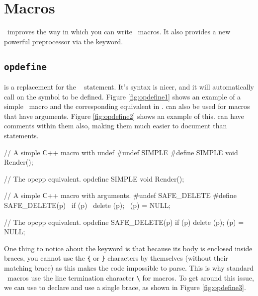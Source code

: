 
\chapter{Macros}
\label{chap:macros}

\opCPP\ improves the way in which you can write \cpp\ macros.  It also provides a new powerful preprocessor via the  keyword.

\section{{\tt opdefine}}
\label{sec:opdefine}

 is a replacement for the \cpp\  statement.  It's syntax is nicer, and it will automatically call  on the symbol to be defined.  Figure \ref{fig:opdefine1} shows an example of a simple \cpp\ macro and the corresponding equivalent in \opCPP.   can also be used for macros that have arguments.  Figure \ref{fig:opdefine2} shows an example of this.   can have comments within them also, making them much easier to document than \cpp\  statements.

\begin{opcpp}[label={fig:opdefine1},caption={Simple \cpp\ macro and corresponding equivalent in \opCPP.}]
// A simple C++ macro with undef
#undef SIMPLE
#define SIMPLE void Render();

// The opcpp equivalent.
opdefine SIMPLE
{
	void Render();
}
\end{opcpp}

\begin{opcpp}[label={fig:opdefine2},caption={\opcppK{opdefine} example with arguments.}]
// A simple C++ macro with arguments.
#undef SAFE_DELETE
#define SAFE_DELETE(p)  \
	if (p)				\
		delete (p);		\
	(p) = NULL;

// The opcpp equivalent.
opdefine SAFE_DELETE(p)
{
	if (p)
		delete (p);
	(p) = NULL;
}
\end{opcpp}

One thing to notice about the  keyword is that because its body is enclosed inside braces, you cannot use the {\tt \{} or {\tt \}} characters by themselves (without their matching brace) as this makes the code impossible to parse.  This is why standard \cpp\ macros use the line termination character \verb!\! for macros.  To get around this issue, we can use  to declare and use a single brace, as shown in Figure \ref{fig:opdefine3}.

